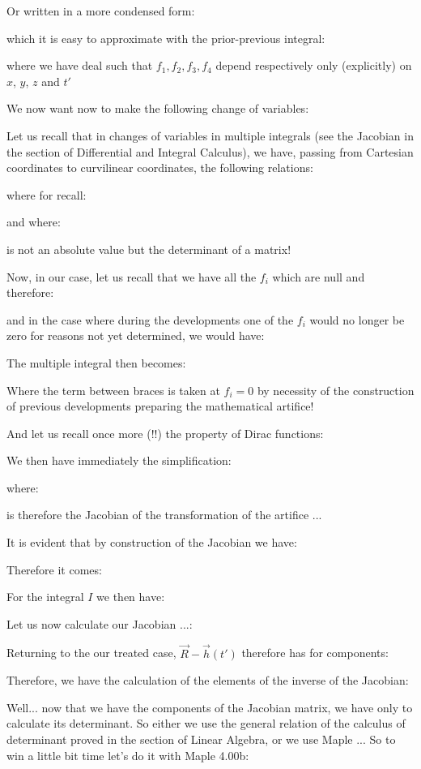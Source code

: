 	Or written in a more condensed form:
	
	which it is easy to approximate with the prior-previous integral:
	
	where we have deal such that $f_1,f_2,f_3,f_4$ depend respectively only (explicitly) on $x$, $y$, $z$ and $t'$ 

	We now want now to make the following change of variables:
	
	Let us recall that in changes of variables in multiple integrals (see the Jacobian in the section of Differential and Integral Calculus), we have, passing from Cartesian coordinates to curvilinear coordinates, the following relations:
	
	where for recall:
	
	and where:
	
	is not an absolute value but the determinant of a matrix!
	
	Now, in our case, let us recall that we have all the $f_i$ which are null and therefore:
	
	and in the case where during the developments one of the $f_i$ would no longer be zero for reasons not yet determined, we would have:
	
	The multiple integral then becomes:
	
	Where the term between braces is taken at $f_i=0$ by necessity of the construction of previous developments preparing the mathematical artifice!

	And let us recall once more (!!) the property of Dirac functions:
	
 	We then have immediately the simplification:
	
	where:
	
	is therefore the Jacobian of the transformation of the artifice ...

	It is evident that by construction of the Jacobian we have:
	
	Therefore it comes:
	
	For the integral $I$ we then have:
	
	Let us now calculate our Jacobian ...:
	
	Returning to the our treated case, $\vec{R}-\vec{h}(t')$ therefore has for components:
	
	Therefore, we have the calculation of the elements of the inverse of the Jacobian:
	
	Well... now that we have the components of the Jacobian matrix, we have only to calculate its determinant. So either we use the general relation of the calculus of determinant proved in the section of Linear Algebra, or we use Maple ... So to win a little bit time let's do it with Maple 4.00b:
	

